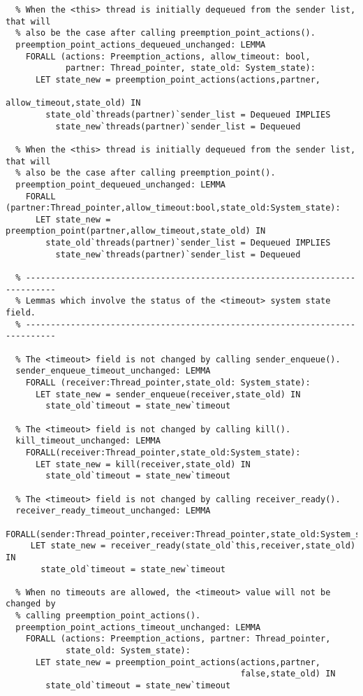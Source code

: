 \begin{lstlisting}
  % When the <this> thread is initially dequeued from the sender list, that will
  % also be the case after calling preemption_point_actions().
  preemption_point_actions_dequeued_unchanged: LEMMA
    FORALL (actions: Preemption_actions, allow_timeout: bool, 
            partner: Thread_pointer, state_old: System_state):
      LET state_new = preemption_point_actions(actions,partner,
                                               allow_timeout,state_old) IN
        state_old`threads(partner)`sender_list = Dequeued IMPLIES
          state_new`threads(partner)`sender_list = Dequeued

  % When the <this> thread is initially dequeued from the sender list, that will 
  % also be the case after calling preemption_point().
  preemption_point_dequeued_unchanged: LEMMA
    FORALL (partner:Thread_pointer,allow_timeout:bool,state_old:System_state):
      LET state_new = preemption_point(partner,allow_timeout,state_old) IN
        state_old`threads(partner)`sender_list = Dequeued IMPLIES
          state_new`threads(partner)`sender_list = Dequeued

  % ----------------------------------------------------------------------------
  % Lemmas which involve the status of the <timeout> system state field.
  % ----------------------------------------------------------------------------

  % The <timeout> field is not changed by calling sender_enqueue().
  sender_enqueue_timeout_unchanged: LEMMA
    FORALL (receiver:Thread_pointer,state_old: System_state):
      LET state_new = sender_enqueue(receiver,state_old) IN
        state_old`timeout = state_new`timeout

  % The <timeout> field is not changed by calling kill().
  kill_timeout_unchanged: LEMMA
    FORALL(receiver:Thread_pointer,state_old:System_state):
      LET state_new = kill(receiver,state_old) IN
        state_old`timeout = state_new`timeout
    
  % The <timeout> field is not changed by calling receiver_ready().
  receiver_ready_timeout_unchanged: LEMMA
   FORALL(sender:Thread_pointer,receiver:Thread_pointer,state_old:System_state):
     LET state_new = receiver_ready(state_old`this,receiver,state_old) IN
       state_old`timeout = state_new`timeout

  % When no timeouts are allowed, the <timeout> value will not be changed by
  % calling preemption_point_actions().
  preemption_point_actions_timeout_unchanged: LEMMA
    FORALL (actions: Preemption_actions, partner: Thread_pointer,
            state_old: System_state):
      LET state_new = preemption_point_actions(actions,partner,
                                               false,state_old) IN
        state_old`timeout = state_new`timeout


\end{lstlisting}
